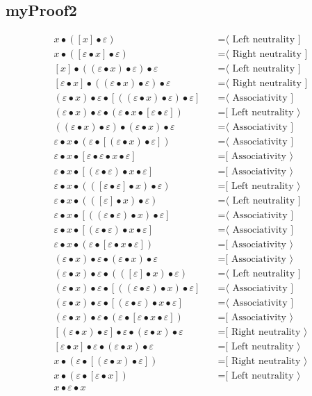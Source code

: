 \documentclass{article}
\begin{document}
\subsection{myProof2}
\begin{align*}
x • ([x] • ε)
  & \quad \text{=⟨ Left neutrality ]}\\
x • ([ε • x] • ε)
  & \quad \text{=⟨ Right neutrality ]}\\
[x] • ((ε • x) • ε) • ε
  & \quad \text{=⟨ Left neutrality ]}\\
[ε • x] • ((ε • x) • ε) • ε
  & \quad \text{=⟨ Right neutrality ]}\\
(ε • x) • ε • [((ε • x) • ε) • ε]
  & \quad \text{=⟨ Associativity ]}\\
(ε • x) • ε • (ε • x • [ε • ε])
  & \quad \text{=[ Left neutrality ⟩}\\
((ε • x) • ε) • (ε • x) • ε
  & \quad \text{=⟨ Associativity ]}\\
ε • x • (ε • [(ε • x) • ε])
  & \quad \text{=⟨ Associativity ]}\\
ε • x • [ε • ε • x • ε]
  & \quad \text{=[ Associativity ⟩}\\
ε • x • [(ε • ε) • x • ε]
  & \quad \text{=[ Associativity ⟩}\\
ε • x • (([ε • ε] • x) • ε)
  & \quad \text{=[ Left neutrality ⟩}\\
ε • x • (([ε] • x) • ε)
  & \quad \text{=⟨ Left neutrality ]}\\
ε • x • [((ε • ε) • x) • ε]
  & \quad \text{=⟨ Associativity ]}\\
ε • x • [(ε • ε) • x • ε]
  & \quad \text{=⟨ Associativity ]}\\
ε • x • (ε • [ε • x • ε])
  & \quad \text{=[ Associativity ⟩}\\
(ε • x) • ε • (ε • x) • ε
  & \quad \text{=[ Associativity ⟩}\\
(ε • x) • ε • (([ε] • x) • ε)
  & \quad \text{=⟨ Left neutrality ]}\\
(ε • x) • ε • [((ε • ε) • x) • ε]
  & \quad \text{=⟨ Associativity ]}\\
(ε • x) • ε • [(ε • ε) • x • ε]
  & \quad \text{=⟨ Associativity ]}\\
(ε • x) • ε • (ε • [ε • x • ε])
  & \quad \text{=[ Associativity ⟩}\\
[(ε • x) • ε] • ε • (ε • x) • ε
  & \quad \text{=[ Right neutrality ⟩}\\
[ε • x] • ε • (ε • x) • ε
  & \quad \text{=[ Left neutrality ⟩}\\
x • (ε • [(ε • x) • ε])
  & \quad \text{=[ Right neutrality ⟩}\\
x • (ε • [ε • x])
  & \quad \text{=[ Left neutrality ⟩}\\
x • ε • x
\end{align*}
\end{document}
